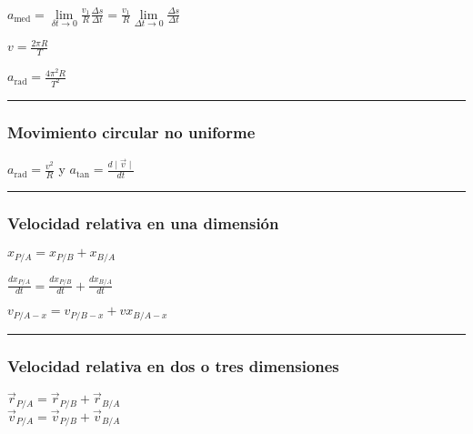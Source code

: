 \documentclass[
]{article}
\begin{document}
{\(a_{\text{med}} = \lim\limits_{\delta t \rightarrow 0}\frac{v_{1}}{R}\frac{\Delta s}{\Delta t} = \frac{v_{1}}{R}\lim\limits_{\Delta t \rightarrow 0}\frac{\Delta s}{\Delta t}\)}

{\(v = \frac{2\pi R}{T}\)}

{\(a_{\text{rad}} = \frac{4\pi^{2}R}{T^{2}}\)}

\begin{center}\rule{0.5\linewidth}{0.5pt}\end{center}

\hypertarget{movimiento-circular-no-uniforme}{%
\subsubsection{Movimiento circular no
uniforme}\label{movimiento-circular-no-uniforme}}

{\(a_{\text{rad}} = \frac{v^{2}}{R}\)} y
{\(a_{\tan} = \frac{d \mid \overset{\rightarrow}{v} \mid}{dt}\)}

\begin{center}\rule{0.5\linewidth}{0.5pt}\end{center}

\hypertarget{velocidad-relativa-en-una-dimensiuxf3n}{%
\subsubsection{Velocidad relativa en una
dimensión}\label{velocidad-relativa-en-una-dimensiuxf3n}}

{\(x_{P/A} = x_{P/B} + x_{B/A}\)}

{\(\frac{dx_{P/A}}{dt} = \frac{dx_{P/B}}{dt} + \frac{dx_{B/A}}{dt}\)}

{\(v_{P/A - x} = v_{P/B - x} + vx_{B/A - x}\)}

\begin{center}\rule{0.5\linewidth}{0.5pt}\end{center}

\hypertarget{velocidad-relativa-en-dos-o-tres-dimensiones}{%
\subsubsection{Velocidad relativa en dos o tres
dimensiones}\label{velocidad-relativa-en-dos-o-tres-dimensiones}}

{\({\overset{\rightarrow}{r}}_{P/A} = {\overset{\rightarrow}{r}}_{P/B} + {\overset{\rightarrow}{r}}_{B/A}\)}\\
{\({\overset{\rightarrow}{v}}_{P/A} = {\overset{\rightarrow}{v}}_{P/B} + {\overset{\rightarrow}{v}}_{B/A}\)}
\end{document}
